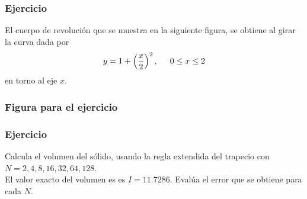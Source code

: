 \begin{frame}
\frametitle{Ejercicio}
El cuerpo de revolución que se muestra en la siguiente figura, se obtiene al girar la curva dada por
\begin{align*}
y = 1 + \left( \dfrac{x}{2} \right)^{2}, \hspace{0.5cm} 0 \leq x \leq 2
\end{align*}
en torno al eje $x$.
\end{frame}
\begin{frame}
\frametitle{Figura para el ejercicio}
\begin{figure}
	\centering
	
\end{figure}
\end{frame}
\begin{frame}
\frametitle{Ejercicio}
Calcula el volumen del sólido, usando la regla extendida del trapecio con $N = 2, 4, 8, 16, 32, 64, 128$.
\\
\bigskip
El valor exacto del volumen es es $I = 11.7286$. Evalúa el error que se obtiene para cada $N$.
\end{frame}
